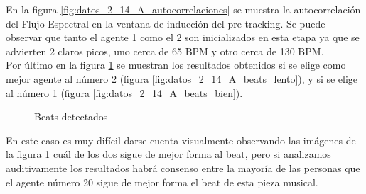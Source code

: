 \documentclass[12pt,a4paper,titlepage]{report}
\begin{document}
En la figura \ref{fig:datos_2_14_A_autocorrelaciones} se muestra la autocorrelación del Flujo Espectral en la ventana de inducción del pre-tracking. Se puede observar que tanto el agente 1 como el 2 son inicializados en esta etapa ya que se advierten 2 claros picos, uno cerca de 65 BPM y otro cerca de 130 BPM.\\

Por último en la figura \ref{fig:datos_2_14_A_beats} se muestran los resultados obtenidos si se elige como mejor agente al número 2 (figura \ref{fig:datos_2_14_A_beats_lento}), y si se elige al número 1 (figura \ref{fig:datos_2_14_A_beats_bien}).\\

\begin{figure} [h!]
\centering
  \caption{Beats detectados}
  \label{fig:datos_2_14_A_beats}
\end{figure}

En este caso es muy difícil darse cuenta visualmente observando las imágenes de la figura \ref{fig:datos_2_14_A_beats} cuál de los dos sigue de mejor forma al beat, pero si analizamos auditivamente los resultados habrá consenso entre la mayoría de las personas que el agente número 20 sigue de mejor forma el beat de esta pieza musical.\\
\end{document}
